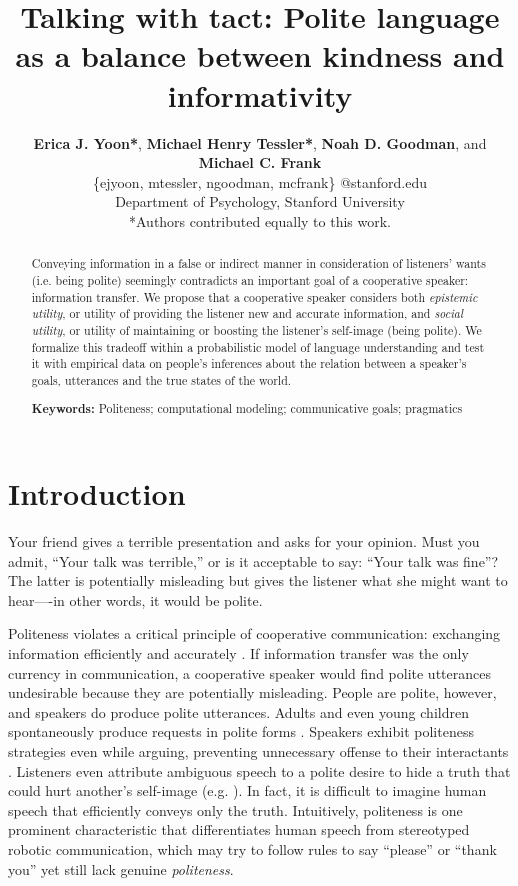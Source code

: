 \documentclass[10pt,letterpaper]{article}
\title{Talking with tact: Polite language as a balance between kindness and informativity}
\author{ {\large \bf Erica J. Yoon*}, {\large \bf Michael Henry Tessler*}, {\large \bf Noah D. Goodman}, and {\large \bf Michael C. Frank}   \\
\{ejyoon, mtessler, ngoodman, mcfrank\} @stanford.edu \\
  Department of Psychology, Stanford University \\
  *Authors contributed equally to this work.}
\begin{document}
\maketitle


\begin{abstract}

Conveying information in a false or indirect manner in consideration of listeners' wants (i.e. being polite)
seemingly contradicts an important goal of a cooperative speaker: information transfer.
We propose that a cooperative speaker considers both
\emph{epistemic utility}, or utility of providing the listener new and accurate information,
and \emph{social utility}, or utility of maintaining or boosting the listener's self-image (being polite).
We formalize this tradeoff within a probabilistic model of language understanding and test it with empirical data on people's inferences about the relation between a speaker's goals, utterances and the true states of the world.

\textbf{Keywords:}
Politeness; computational modeling; communicative goals; pragmatics

\end{abstract}


\section{Introduction}

Your friend gives a terrible presentation and asks for your opinion.
Must you admit, ``Your talk was terrible,'' or is it acceptable to say: ``Your talk was fine''?
The latter is potentially misleading but gives the listener what she might want to hear----in other words, it would be polite.

Politeness violates a critical principle of cooperative communication: exchanging information efficiently and accurately \cite{Grice1975}.
If information transfer was the only currency in communication, a cooperative speaker would find polite utterances undesirable because they are potentially misleading.
People are polite, however, and speakers do produce polite utterances.
Adults and even young children spontaneously produce requests in polite forms \cite{clark1980, axia1985}.
Speakers exhibit politeness strategies even while arguing, preventing unnecessary offense to their interactants \cite{holtgraves1997}.
Listeners even attribute ambiguous speech to a polite desire to hide a truth that could hurt another's self-image (e.g. ).
In fact, it is difficult to imagine human speech that efficiently conveys only the truth.
Intuitively, politeness is one prominent characteristic that differentiates human speech from stereotyped robotic communication, 
which may try to follow rules to say ``please'' or ``thank you'' yet still lack genuine \emph{politeness}. 
\end{document}
